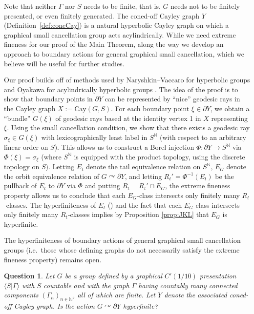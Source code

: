 \documentclass{article}[11pt]
\newtheorem{ques}{Question}
\newcommand{\N}{\mathbb{N}}
\newcommand{\DO}[1]{{\textcolor{green}{{\bf Damian:}{\small {~#1~}}}}}
\begin{document}

{\color{black}Note that neither $\Gamma$ nor $S$ needs to be finite, that is, $G$ needs not to be finitely presented, or even finitely generated. The coned-off Cayley graph $Y$ (Definition~\ref{def:coneCay}) is a natural hyperbolic Cayley graph on which a graphical small cancellation group acts acylindrically. While we need extreme fineness for our proof of the Main Theorem, along the way we develop an approach to boundary actions for general graphical small cancellation, which we believe will be useful for further studies.

Our proof builds off of methods used by Naryshkin--Vaccaro for hyperbolic groups \cite{NaryshVacc} and Oyakawa for acylindrically hyperbolic groups \cite{MR4715159}. The idea of the proof is to show that boundary points in $\partial Y$ can be represented by ``nice'' geodesic rays in the Cayley graph $X:= \mathrm{Cay}(G,S)$. For each boundary point $\xi \in \partial Y$, we obtain a ``bundle'' $G(\xi)$ of geodesic rays based at the identity vertex 1 in $X$ representing $\xi$. Using the small cancellation condition, we show that there exists a geodesic ray $\sigma_{\xi} \in G(\xi)$ with lexicographically least label in $S^{\N}$ (with respect to an arbitrary linear order on $S$). This allows us to construct a Borel injection $\Phi: \partial Y \to S^{\N}$ via $\Phi(\xi) = \sigma_{\xi}$ (where $S^{\N}$ is equipped with the product topology, using the discrete topology on $S$). Letting $E_t$ denote the tail equivalence relation on $S^{\N}$, $E_G$ denote the orbit equivalence relation of $G \curvearrowright \partial Y$, and letting $R_t' = \Phi^{-1}(E_t)$ be the pullback of $E_t$ to $\partial Y$ via $\Phi$ and putting $R_t = R_t' \cap E_G$, the extreme fineness property allows us to conclude that each $E_G$-class intersects only finitely many $R_t$-classes. The hyperfiniteness of $E_t$ (\cite[Corollary 8.2]{DJK94}) and the fact that each $E_G$-class intersects only finitely many $R_t$-classes implies by Proposition \ref{prop:JKL} that $E_G$ is hyperfinite. 

The hyperfiniteness of boundary actions of general graphical small cancellation groups (i.e.\ those whose defining graphs do not necessarily satisfy the extreme fineness property) remains open. 

\begin{ques}
    \label{B}
    Let $G$ be a group defined by a graphical $C'(1/10)$ presentation $\langle S \vert \Gamma \rangle$ with $S$ countable and with the graph $\Gamma$ having countably many connected components $(\Gamma_n)_{n \in \N}$, all of which are finite. Let $Y$ denote the associated coned-off Cayley graph. Is the action $G \curvearrowright \partial Y$ hyperfinite?
\end{ques}

}
\end{document}
